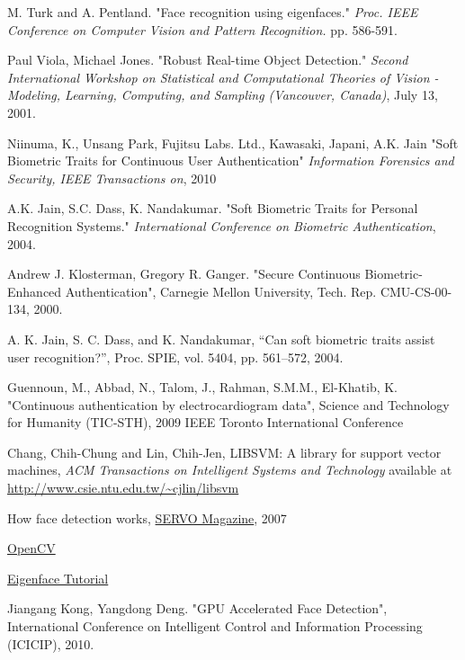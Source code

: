 \begin{thebibliography}{77}
 M. Turk and A. Pentland.
"Face recognition using eigenfaces."
\emph{Proc. IEEE Conference on Computer Vision and Pattern Recognition.} pp. 586-591.

Paul Viola, Michael Jones.
"Robust Real-time Object Detection."
\emph{Second International Workshop on Statistical and Computational Theories of Vision - Modeling, Learning, Computing, and Sampling (Vancouver, Canada)}, July 13, 2001.

 Niinuma, K., Unsang Park, Fujitsu Labs. Ltd., Kawasaki, Japani, A.K. Jain
"Soft Biometric Traits for Continuous User Authentication" 
\emph{Information Forensics and Security, IEEE Transactions on}, 2010

A.K. Jain, S.C. Dass, K. Nandakumar.
"Soft Biometric Traits for Personal Recognition Systems."
\emph{International Conference on Biometric Authentication}, 2004.

Andrew J. Klosterman, Gregory R. Ganger.
"Secure Continuous Biometric-Enhanced Authentication", 
Carnegie Mellon University, Tech. Rep. CMU-CS-00-134, 2000.

A. K. Jain, S. C. Dass, and K. Nandakumar,
“Can soft biometric traits assist user recognition?”,
Proc. SPIE, vol. 5404, pp. 561–572, 2004.

 Guennoun, M., Abbad, N., Talom, J., Rahman, S.M.M., El-Khatib, K. 
"Continuous authentication by electrocardiogram data",
Science and Technology for Humanity (TIC-STH), 2009 IEEE Toronto International Conference

Chang, Chih-Chung and Lin, Chih-Jen,
LIBSVM: A library for support vector machines,
\emph{ACM Transactions on Intelligent Systems and Technology}
available at \url{http://www.csie.ntu.edu.tw/~cjlin/libsvm}

How face detection works,
\href{http://www.servomagazine.com/}{SERVO Magazine}, 2007

\href{http://www.opencv.willowgarage.com/}{OpenCV}

\href{http://www.pages.drexel.edu/~sis26/Eigenface\%20Tutorial.htm}{Eigenface Tutorial}

 Jiangang Kong, Yangdong Deng. 
"GPU Accelerated Face Detection",
International Conference on Intelligent Control and Information Processing (ICICIP), 2010.


\end{thebibliography}
